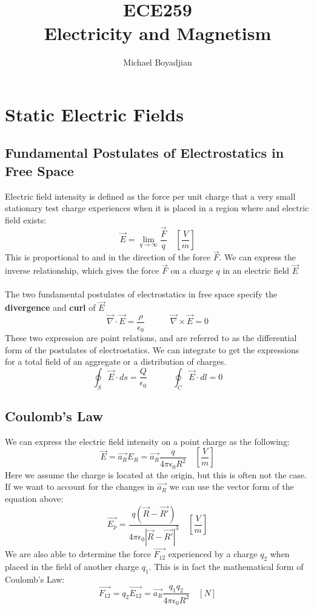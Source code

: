 \documentclass[11pt]{article}
\begin{document}
\title{ECE259 \\ Electricity and Magnetism}
\author{Michael Boyadjian}
\maketitle
\pagebreak

\tableofcontents

\pagebreak

\bigskip
\bigskip
\bigskip

\section{Static Electric Fields}

\subsection{Fundamental Postulates of Electrostatics in Free Space}
Electric field intensity is defined as the force per unit charge that a very small stationary test charge experiences when it is placed in a region where and electric field exists:
$$ \vec{E} = \lim_{q \to \infty} \frac{\vec{F}}{q} \quad \left[\frac{V}{m}\right] $$
This is proportional to and in the direction of the force $\vec{F}$. We can express the inverse relationship, which gives the force $\vec{F}$ on a charge $q$ in an electric field $\vec{E}$ \\ \\
The two fundamental postulates of electrostatics in free space specify the \textbf{divergence} and \textbf{curl} of $\vec{E}$
$$ \vec{ \nabla}  \cdot \vec{E} = \frac{\rho}{\epsilon_0} \quad \quad \quad \vec{ \nabla}  \times \vec{E} =0 $$
These two expression are point relations, and are referred to as the differential form of the postulates of electrostatics. We can integrate to get the expressions for a total field of an aggregate or a distribution of charges.
$$ \oint_{S} \vec{ E}  \cdot ds = \frac{Q}{\epsilon_0}\quad \quad \quad \oint_{C} \vec{ E}  \cdot dl = 0 $$


\subsection{Coulomb's Law}
We can express the electric field intensity on a point charge as the following:
$$ \vec{E} = \vec{a_R}E_R = \vec{a_R} \frac{q}{4 \pi \epsilon_0 R^2} \quad \left[\frac{V}{m}\right]$$
Here we assume the charge is located at the origin, but this is often not the case. If we want to account for the changes in $\vec{a_R}$ we can use the vector form of the equation above:
$$ \vec{E_p} =  \frac{q (\vec{R} - \vec{R'})}{4 \pi \epsilon_0 |\vec{R} - \vec{R'}|^3} \quad \left[\frac{V}{m}\right]$$
We are also able to determine the force $\vec{F_{12}}$ experienced by a charge $q_2$ when placed in the field of another charge $q_1$. This is in fact the mathematical form of Coulomb's Law:
$$ \vec{F_{12}} = q_2\vec{E_{12}} = \vec{a_R} \frac{q_1q_2}{4\pi\epsilon_0R^2} \quad [N]$$
\end{document}
